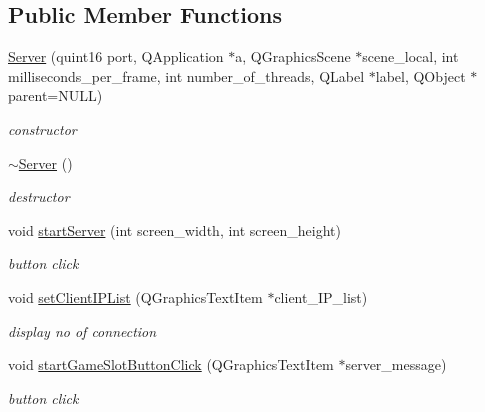 \subsection*{Public Member Functions}
\begin{DoxyCompactItemize}
\item 
\hypertarget{classServer_af5b47a498608d9cd1740621ae11172ca}{\hyperlink{classServer_af5b47a498608d9cd1740621ae11172ca}{Server} (quint16 port, Q\-Application $\ast$a, Q\-Graphics\-Scene $\ast$scene\-\_\-local, int milliseconds\-\_\-per\-\_\-frame, int number\-\_\-of\-\_\-threads, Q\-Label $\ast$label, Q\-Object $\ast$parent=N\-U\-L\-L)}\label{classServer_af5b47a498608d9cd1740621ae11172ca}

\begin{DoxyCompactList}\small\item\em constructor \end{DoxyCompactList}\item 
\hypertarget{classServer_a4b3aa2579cb1c8cd1d069582c14d0fa6}{\hyperlink{classServer_a4b3aa2579cb1c8cd1d069582c14d0fa6}{$\sim$\-Server} ()}\label{classServer_a4b3aa2579cb1c8cd1d069582c14d0fa6}

\begin{DoxyCompactList}\small\item\em destructor \end{DoxyCompactList}\item 
void \hyperlink{classServer_a21f4d5fa308381bd91b5d584b222c471}{start\-Server} (int screen\-\_\-width, int screen\-\_\-height)
\begin{DoxyCompactList}\small\item\em button click \end{DoxyCompactList}\item 
void \hyperlink{classServer_a4f7a988666f3cd4b91d14a6016a0cedf}{set\-Client\-I\-P\-List} (Q\-Graphics\-Text\-Item $\ast$client\-\_\-\-I\-P\-\_\-list)
\begin{DoxyCompactList}\small\item\em display no of connection \end{DoxyCompactList}\item 
\hypertarget{classServer_a5fa376b713c9c80ad1cd6ffb3ac1e23d}{void \hyperlink{classServer_a5fa376b713c9c80ad1cd6ffb3ac1e23d}{start\-Game\-Slot\-Button\-Click} (Q\-Graphics\-Text\-Item $\ast$server\-\_\-message)}\label{classServer_a5fa376b713c9c80ad1cd6ffb3ac1e23d}

\begin{DoxyCompactList}\small\item\em button click \end{DoxyCompactList}\end{DoxyCompactItemize}
